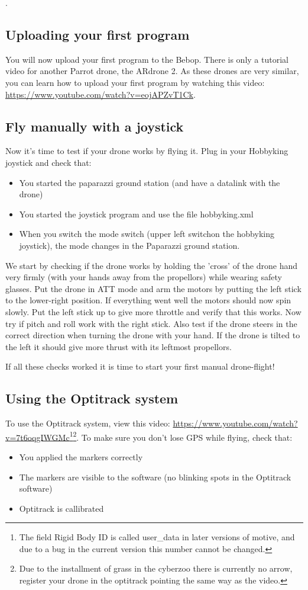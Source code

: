 \documentclass{article}
\begin{document}
. 
\subsection*{Uploading your first program}
You will now upload your first program to the Bebop. There is only a tutorial video for another Parrot drone, the ARdrone 2. As these drones are very similar, you can learn how to upload your first program by watching this video: \url{https://www.youtube.com/watch?v=eojAPZvT1Ck}.

\subsection*{Fly manually with a joystick }
Now it's time to test if your drone works by flying it. Plug in your Hobbyking joystick and check that:
\begin{itemize}
\item You started the paparazzi ground station (and have a datalink with the drone)
\item You started the joystick program and use the file hobbyking.xml
\item When you switch the mode switch (upper left switchon the hobbyking joystick), the mode changes in the Paparazzi ground station.
\end{itemize}

We start by checking if the drone works by holding the 'cross' of the drone hand very firmly (with your hands away from the propellors) while wearing safety glasses. Put the drone in ATT mode and arm the motors by putting the left stick to the lower-right position. If everything went well the motors should now spin slowly. Put the left stick up to give more throttle and verify that this works. Now try if pitch and roll work with the right stick. 
Also test if the drone steers in the correct direction when turning the drone with your hand. If the drone is tilted to the left it should give more thrust with its leftmost propellors. 

If all these checks worked it is time to start your first manual drone-flight! 

\subsection*{Using the Optitrack system}
To use the Optitrack system, view this video: \url{https://www.youtube.com/watch?v=7t6oqgIWGMc}\footnote{The field Rigid Body ID is called user\_data in later versions of motive, and due to a bug in the current version this number cannot be changed.}\footnote{Due to the installment of grass in the cyberzoo there is currently no arrow, register your drone in the optitrack pointing the same way as the video.}.
To make sure you don't lose GPS while flying, check that:
\begin{itemize}
\item You applied the markers correctly 
\item The markers are visible to the software (no blinking spots in the Optitrack software)
\item Optitrack is callibrated
\end{itemize}
\end{document}
